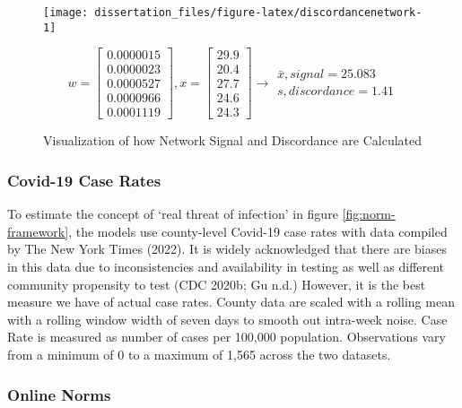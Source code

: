 \begin{figure}

\begin{center}\texttt{[image: dissertation\_files/figure-latex/discordancenetwork-1]} \end{center}
  \begin{equation}
    w = \begin{bmatrix}0.0000015\\0.0000023\\0.0000527\\0.0000966\\0.0001119\end{bmatrix},  
    x = \begin{bmatrix}29.9\\20.4\\27.7\\24.6\\24.3\end{bmatrix} \longrightarrow
    \begin{matrix} \bar{x}, signal = 25.083\\ s, discordance = 1.41 \end{matrix} 
  \end{equation}
  \caption{Visualization of how Network Signal and Discordance are Calculated}
  \label{fig:discordancenetwork}
\end{figure}

\hypertarget{covid-19-case-rates}{%
\subsubsection{Covid-19 Case Rates}\label{covid-19-case-rates}}

To estimate the concept of `real threat of infection' in figure
\ref{fig:norm-framework}, the models use county-level Covid-19 case rates with
data compiled by The New York Times (2022). It is widely acknowledged that there are biases in
this data due to inconsistencies and availability in testing as well as
different community propensity to test (CDC 2020b; Gu n.d.) However, it is the best
measure we have of actual case rates. County data are scaled with a rolling mean
with a rolling window width of seven days to smooth out intra-week noise. Case
Rate is measured as number of cases per 100,000 population. Observations vary
from a minimum of 0 to a maximum of 1,565 across the two datasets.

\hypertarget{online-norms}{%
\subsubsection{Online Norms}\label{online-norms}}

